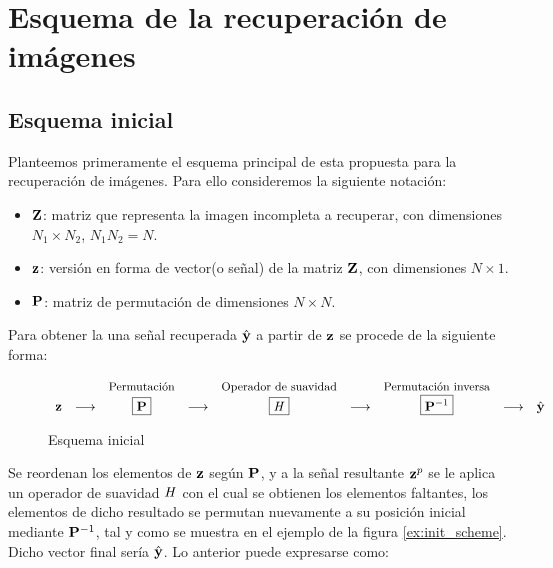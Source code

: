 \chapter{Esquema de la recuperaci\'on de im\'agenes}\label{chapter:SCHEME}

\section{Esquema inicial}
Planteemos primeramente el esquema principal de esta propuesta para la recuperaci\'on de im\'agenes. Para ello consideremos la siguiente notaci\'on:

\begin{itemize}
	\item $\Z$: matriz que representa la imagen incompleta a recuperar, con dimensiones $N_1 \times N_2$, $N_1N_2 = N$.
	\item $\z$: versión en forma de vector(o señal) de la matriz $\Z$, con dimensiones $N \times 1$.
	\item $\P$: matriz de permutaci\'on de dimensiones $N \times N$.
\end{itemize}

Para obtener la una señal recuperada $\yhat$ a partir de $\z$ se procede de la siguiente forma:

\qquad

\begin{figure}[h]
	\centering
	\begin{equation*}
		\begin{array}[t]{ccccccccc}
			& & \mbox{\small{Permutaci\'on}} & & \mbox{\small{Operador de suavidad}} & & \mbox{\small{Permutaci\'on inversa}} & &\\
			\z & \longrightarrow & \boxed{\P} & \longrightarrow & \boxed{\H} & \longrightarrow & \boxed{\P^{-1}} & \longrightarrow & \yhat \\
		\end{array}
	\end{equation*}
	\caption{Esquema inicial}
	\label{fig:init_scheme}
\end{figure}

\qquad

Se reordenan los elementos de $\z$ seg\'un $\P$, y a la señal resultante $\z^p$ se le aplica un operador de suavidad $\H$ con el cual se obtienen los elementos faltantes, los elementos de dicho resultado se permutan nuevamente a su posici\'on inicial mediante $\P^{-1}$, tal y como se muestra en el ejemplo de la figura \ref{ex:init_scheme}. Dicho vector final ser\'ia $\yhat$. Lo anterior puede expresarse como:

